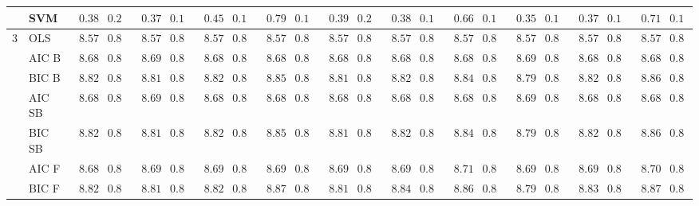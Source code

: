 \begin{tabular}{p{0.2cm}p{1cm}|p{0.6cm}p{0.6cm}|p{0.6cm}p{0.6cm}p{0.6cm}p{0.6cm}p{0.6cm}p{0.6cm}|p{0.6cm}p{0.6cm}p{0.6cm}p{0.6cm}p{0.6cm}p{0.6cm}|p{0.6cm}p{0.6cm}p{0.6cm}p{0.6cm}p{0.6cm}p{0.6cm}}
 & SVM  & $\phantom{0}0.38$ & $0.20$ & $\phantom{0}0.37$ & $0.19$ & $\phantom{0}0.45$ & $0.17$ & $\phantom{0}0.79$ & $0.15$ & $\phantom{0}0.39$ & $0.22$ & $\phantom{0}0.38$ & $0.15$ & $\phantom{0}0.66$ & $0.10$ & $\phantom{0}0.35$ & $0.16$ & $\phantom{0}0.37$ & $0.10$ & $\phantom{0}0.71$ & $0.12$ \\\hline
3 & OLS  & $\phantom{0}8.57$ & $0.81$ & $\phantom{0}8.57$ & $0.81$ & $\phantom{0}8.57$ & $0.81$ & $\phantom{0}8.57$ & $0.81$ & $\phantom{0}8.57$ & $0.81$ & $\phantom{0}8.57$ & $0.81$ & $\phantom{0}8.57$ & $0.81$ & $\phantom{0}8.57$ & $0.81$ & $\phantom{0}8.57$ & $0.81$ & $\phantom{0}8.57$ & $0.81$ \\
 & AIC B  & $\phantom{0}8.68$ & $0.80$ & $\phantom{0}8.69$ & $0.82$ & $\phantom{0}8.68$ & $0.82$ & $\phantom{0}8.68$ & $0.81$ & $\phantom{0}8.68$ & $0.81$ & $\phantom{0}8.68$ & $0.82$ & $\phantom{0}8.68$ & $0.81$ & $\phantom{0}8.69$ & $0.81$ & $\phantom{0}8.68$ & $0.81$ & $\phantom{0}8.68$ & $0.82$ \\
 & BIC B  & $\phantom{0}8.82$ & $0.83$ & $\phantom{0}8.81$ & $0.84$ & $\phantom{0}8.82$ & $0.81$ & $\phantom{0}8.85$ & $0.84$ & $\phantom{0}8.81$ & $0.83$ & $\phantom{0}8.82$ & $0.82$ & $\phantom{0}8.84$ & $0.85$ & $\phantom{0}8.79$ & $0.83$ & $\phantom{0}8.82$ & $0.82$ & $\phantom{0}8.86$ & $0.83$ \\
 & AIC SB  & $\phantom{0}8.68$ & $0.80$ & $\phantom{0}8.69$ & $0.82$ & $\phantom{0}8.68$ & $0.82$ & $\phantom{0}8.68$ & $0.81$ & $\phantom{0}8.68$ & $0.81$ & $\phantom{0}8.68$ & $0.82$ & $\phantom{0}8.68$ & $0.81$ & $\phantom{0}8.69$ & $0.81$ & $\phantom{0}8.68$ & $0.81$ & $\phantom{0}8.68$ & $0.82$ \\
 & BIC SB  & $\phantom{0}8.82$ & $0.83$ & $\phantom{0}8.81$ & $0.84$ & $\phantom{0}8.82$ & $0.81$ & $\phantom{0}8.85$ & $0.84$ & $\phantom{0}8.81$ & $0.83$ & $\phantom{0}8.82$ & $0.82$ & $\phantom{0}8.84$ & $0.85$ & $\phantom{0}8.79$ & $0.83$ & $\phantom{0}8.82$ & $0.82$ & $\phantom{0}8.86$ & $0.83$ \\
 & AIC F  & $\phantom{0}8.68$ & $0.80$ & $\phantom{0}8.69$ & $0.82$ & $\phantom{0}8.69$ & $0.82$ & $\phantom{0}8.69$ & $0.82$ & $\phantom{0}8.69$ & $0.81$ & $\phantom{0}8.69$ & $0.82$ & $\phantom{0}8.71$ & $0.82$ & $\phantom{0}8.69$ & $0.81$ & $\phantom{0}8.69$ & $0.81$ & $\phantom{0}8.70$ & $0.82$ \\
 & BIC F  & $\phantom{0}8.82$ & $0.83$ & $\phantom{0}8.81$ & $0.84$ & $\phantom{0}8.82$ & $0.81$ & $\phantom{0}8.87$ & $0.83$ & $\phantom{0}8.81$ & $0.83$ & $\phantom{0}8.84$ & $0.83$ & $\phantom{0}8.86$ & $0.85$ & $\phantom{0}8.79$ & $0.83$ & $\phantom{0}8.83$ & $0.82$ & $\phantom{0}8.87$ & $0.84$ \\

\end{tabular}
